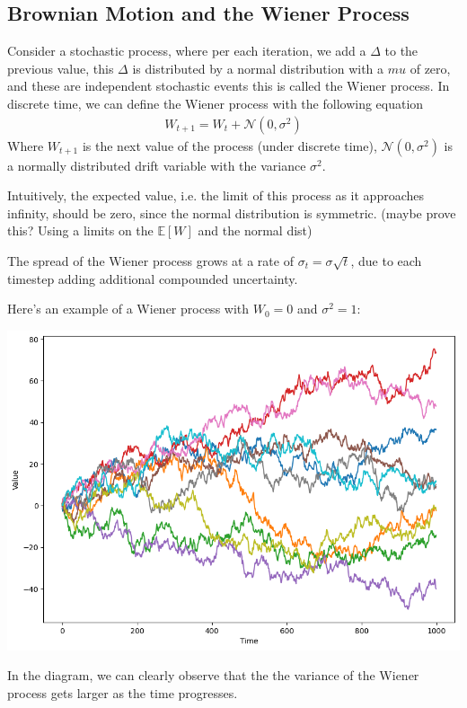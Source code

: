 \documentclass{article}
\begin{document}
\begin{spacing}{2.0}

\section{Brownian Motion and the Wiener Process}

Consider a stochastic process, where per each iteration, we add a $\Delta$ to the previous value,
this $\Delta$ is distributed by a normal distribution with a $mu$ of zero, and these are independent
stochastic events this is called the Wiener process. In discrete time, we can define the Wiener process
with the following equation
\begin{gather*}
    W_{t + 1} = W_{t} + \mathcal{N}(0, \sigma^{2})
\end{gather*}
Where $W_{t + 1}$ is the next value of the process (under discrete time), $\mathcal{N}(0, \sigma^{2})$
is a normally distributed drift variable with the variance $\sigma^{2}$.

Intuitively, the expected value, i.e. the limit of this process as it approaches infinity, should
be zero, since the normal distribution is symmetric. (maybe prove this? Using a limits on the $\mathbb{E}[W]$ and the normal dist)

The spread of the Wiener process grows at a rate of $\sigma_{t} = \sigma \sqrt{t}$, due to each timestep adding additional compounded uncertainty.

Here's an example of a Wiener process with $W_{0} = 0$ and $\sigma^{2} = 1$:
\begin{center}
    \includegraphics[scale=0.35]{./images/wiener.png}
\end{center}
In the diagram, we can clearly observe that the the variance of the Wiener process gets larger as the time progresses.


\end{spacing}
\end{document}
